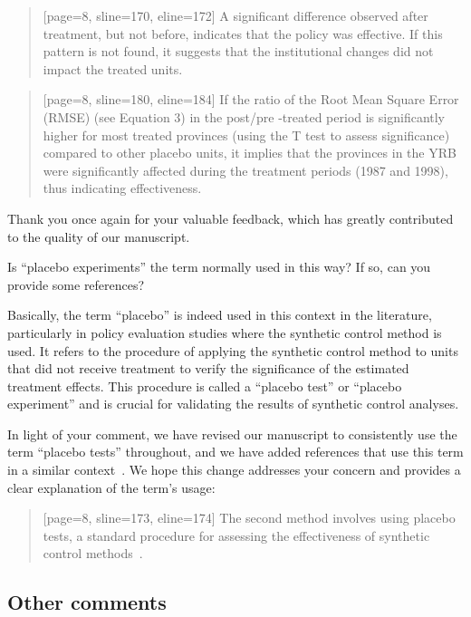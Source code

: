 \begin{quote}[page=8, sline=170, eline=172]
    A significant difference observed after treatment, but not before, indicates that the policy was effective.
    If this pattern is not found, it suggests that the institutional changes did not impact the treated units.
\end{quote}

\begin{quote}[page=8, sline=180, eline=184]
    If the ratio of the Root Mean Square Error (RMSE) (see Equation 3) in the post/pre -treated period is significantly higher for most treated provinces (using the T test to assess significance) compared to other placebo units, it implies that the provinces in the YRB were significantly affected during the treatment periods (1987 and 1998), thus indicating effectiveness.
\end{quote}

\AR*{} Thank you once again for your valuable feedback, which has greatly contributed to the quality of our manuscript.

\RC{} Is ``placebo experiments'' the term normally used in this way? If so, can you provide some references?

\AR{} Basically, the term ``placebo'' is indeed used in this context in the literature, particularly in policy evaluation studies where the synthetic control method is used. It refers to the procedure of applying the synthetic control method to units that did not receive treatment to verify the significance of the estimated treatment effects. This procedure is called a ``placebo test'' or ``placebo experiment'' and is crucial for validating the results of synthetic control analyses.

\AR*{} In light of your comment, we have revised our manuscript to consistently use the term ``placebo tests'' throughout, and we have added references that use this term in a similar context~\cite{abadie2010}. We hope this change addresses your concern and provides a clear explanation of the term's usage:

\begin{quote}[page=8, sline=173, eline=174]
    The second method involves using placebo tests, a standard procedure for assessing the effectiveness of synthetic control methods~\cite{abadie2010}.
\end{quote}

\subsection{Other comments}\label{sec:1-3}

